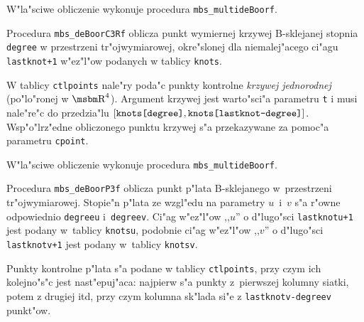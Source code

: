W"la"sciwe obliczenie wykonuje procedura \texttt{mbs\_multideBoorf}.

\vspace{\bigskipamount}
\begin{sloppypar}
Procedura \texttt{mbs\_deBoorC3Rf} oblicza punkt wymiernej krzywej
B-sklejanej stopnia \texttt{degree} w przestrzeni tr"ojwymiarowej,
okre"slonej dla niemalej"acego ci"agu \texttt{lastknot+1} w"ez"l"ow
podanych w tablicy \texttt{knots}.

W tablicy \texttt{ctlpoints}
nale"ry poda"c punkty kon\-trol\-ne \emph{krzywej jednorodnej}
(po"lo"ronej w $\R^4$).
Argument krzywej jest warto"sci"a parametru \texttt{t} i musi nale"re"c
do przedzia"lu
$[\mbox{\texttt{knots[degree]}},\mbox{\texttt{knots[lastknot-degree]}}]$.
Wsp"o"lrz"edne obliczonego punktu
krzywej s"a przekazywane za pomoc"a parametru \texttt{cpoint}.
\end{sloppypar}

W"la"sciwe obliczenie wykonuje procedura \texttt{mbs\_multideBoorf}.


\vspace{\bigskipamount}
Procedura \texttt{mbs\_deBoorP3f} oblicza punkt p"lata B-sklejanego
w~przestrzeni tr"ojwymiarowej. Stopie"n p"lata ze wzgl"edu na parametry
$u$~i~$v$ s"a r"owne odpowiednio \texttt{degreeu} i~\texttt{degreev}.
Ci"ag w"ez"l"ow ,,$u$'' o d"lugo"sci \texttt{lastknotu+1} jest podany
w~tablicy \texttt{knotsu}, podobnie ci"ag w"ez"l"ow ,,$v$'' o d"lugo"sci
\texttt{lastknotv+1} jest podany w~tablicy \texttt{knotsv}.

Punkty kontrolne p"lata s"a podane w tablicy \texttt{ctlpoints}, przy czym
ich kolejno"s"c jest nast"epuj"aca: najpierw s"a punkty z~pierwszej kolumny
siatki, potem z drugiej itd, przy czym kolumna sk"lada si"e z
\texttt{lastknotv-degreev} punkt"ow.

